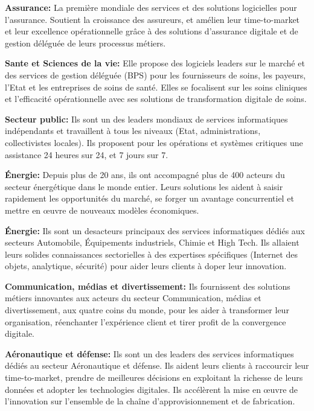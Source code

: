 \begin{description}
  \item \textbf{Assurance:} La première mondiale des services et des solutions logicielles pour l’assurance. Soutient la croissance des assureurs, et amélien leur time-to-market et leur excellence opérationnelle grâce à des solutions d’assurance digitale et de gestion déléguée de leurs processus métiers.
  \item \textbf{Sante et Sciences de la vie:} Elle propose des logiciels leaders sur le marché et des services de gestion déléguée (BPS) pour les fournisseurs de soins, les payeurs, l’Etat et les entreprises de soins de santé. Elles se focalisent sur les soins cliniques et l’efficacité opérationnelle avec ses solutions de transformation digitale de soins.
  \item \textbf{Secteur public:} Ils sont un des leaders mondiaux de services informatiques indépendants et travaillent à tous les niveaux (Etat, administrations, collectivistes locales). Ils proposent pour les opérations et systèmes critiques une assistance 24 heures sur 24, et 7 jours sur 7.
  \item \textbf{Énergie:} Depuis plus de 20 ans, ils ont accompagné plus de 400 acteurs du secteur énergétique dans le monde entier. Leurs solutions les aident à saisir rapidement les opportunités du marché, se forger un avantage concurrentiel et mettre en œuvre de nouveaux modèles économiques.
  \item \textbf{Énergie:} Ils sont un desacteurs principaux des services informatiques dédiés aux secteurs Automobile, Équipements industriels, Chimie et High Tech. Ils allaient leurs solides connaissances sectorielles à des expertises spécifiques (Internet des objets, analytique, sécurité) pour aider leurs clients à doper leur innovation.
  \item \textbf{Communication, médias et divertissement:} Ils fournissent des solutions métiers innovantes aux acteurs du secteur Communication, médias et divertissement, aux quatre coins du monde, pour les aider à transformer leur organisation, réenchanter l’expérience client et tirer profit de la convergence digitale.
  \item \textbf{Aéronautique et défense:} Ils sont un des leaders des services informatiques dédiés au secteur Aéronautique et défense. Ils aident leurs clients à raccourcir leur time-to-market, prendre de meilleures décisions en exploitant la richesse de leurs données et adopter les technologies digitales. Ils accélèrent la mise en œuvre de l’innovation sur l’ensemble de la chaîne d’approvisionnement et de fabrication.

\end{description}
